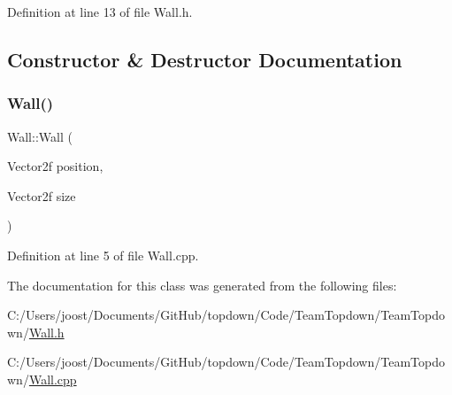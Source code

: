 Definition at line 13 of file Wall.\+h.



\subsection{Constructor \& Destructor Documentation}
\mbox{\label{class_wall_ad8db4b51570f4a83de3750082f826516}} 
\subsubsection{\texorpdfstring{Wall()}{Wall()}}
{\footnotesize\ttfamily Wall\+::\+Wall (\begin{DoxyParamCaption}\item[{Vector2f}]{position,  }\item[{Vector2f}]{size }\end{DoxyParamCaption})}



Definition at line 5 of file Wall.\+cpp.



The documentation for this class was generated from the following files\+:\begin{DoxyCompactItemize}
\item 
C\+:/\+Users/joost/\+Documents/\+Git\+Hub/topdown/\+Code/\+Team\+Topdown/\+Team\+Topdown/\hyperlink{_wall_8h}{Wall.\+h}\item 
C\+:/\+Users/joost/\+Documents/\+Git\+Hub/topdown/\+Code/\+Team\+Topdown/\+Team\+Topdown/\hyperlink{_wall_8cpp}{Wall.\+cpp}\end{DoxyCompactItemize}
